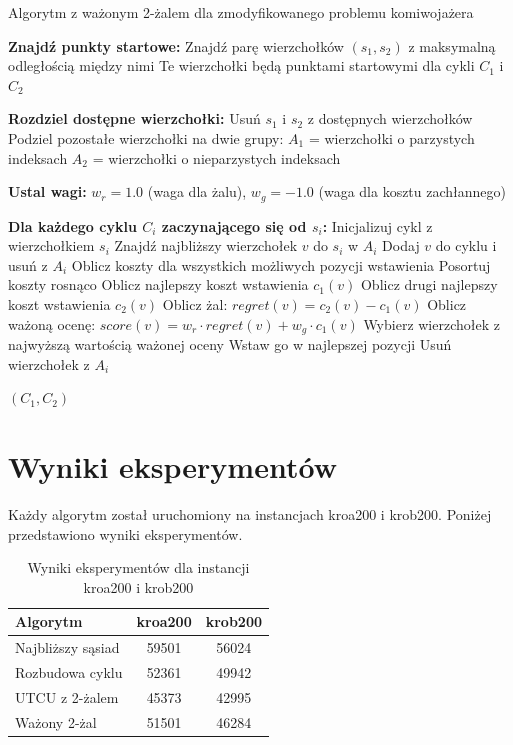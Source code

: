 \documentclass[12pt,a4paper]{article}
\begin{document}
\begin{algorithm}
\caption{Algorytm z ważonym 2-żalem dla zmodyfikowanego problemu komiwojażera}
\begin{algorithmic}[1]
\State \textbf{Znajdź punkty startowe:}
\State Znajdź parę wierzchołków $(s_1, s_2)$ z maksymalną odległością między nimi
\State Te wierzchołki będą punktami startowymi dla cykli $C_1$ i $C_2$

\State \textbf{Rozdziel dostępne wierzchołki:}
\State Usuń $s_1$ i $s_2$ z dostępnych wierzchołków
\State Podziel pozostałe wierzchołki na dwie grupy:
\State $A_1$ = wierzchołki o parzystych indeksach
\State $A_2$ = wierzchołki o nieparzystych indeksach

\State \textbf{Ustal wagi:} $w_r = 1.0$ (waga dla żalu), $w_g = -1.0$ (waga dla kosztu zachłannego)

\State \textbf{Dla każdego cyklu $C_i$ zaczynającego się od $s_i$:}
\State Inicjalizuj cykl z wierzchołkiem $s_i$
\State Znajdź najbliższy wierzchołek $v$ do $s_i$ w $A_i$
\State Dodaj $v$ do cyklu i usuń z $A_i$
        \State Oblicz koszty dla wszystkich możliwych pozycji wstawienia
        \State Posortuj koszty rosnąco
        \State Oblicz najlepszy koszt wstawienia $c_1(v)$
        \State Oblicz drugi najlepszy koszt wstawienia $c_2(v)$
        \State Oblicz żal: $regret(v) = c_2(v) - c_1(v)$
        \State Oblicz ważoną ocenę: $score(v) = w_r \cdot regret(v) + w_g \cdot c_1(v)$
    \EndFor
    \State Wybierz wierzchołek z najwyższą wartością ważonej oceny
    \State Wstaw go w najlepszej pozycji
    \State Usuń wierzchołek z $A_i$
\EndWhile

\State \Return $(C_1, C_2)$
\end{algorithmic}
\end{algorithm}

\section{Wyniki eksperymentów}
Każdy algorytm został uruchomiony na instancjach kroa200 i krob200. Poniżej przedstawiono wyniki eksperymentów.

\begin{table}[H]
\centering
\caption{Wyniki eksperymentów dla instancji kroa200 i krob200}
\begin{tabular}{lcc}
\toprule
\textbf{Algorytm} & \textbf{kroa200} & \textbf{krob200} \\
\midrule
Najbliższy sąsiad & 59501 & 56024 \\
Rozbudowa cyklu & 52361 & 49942 \\
UTCU z 2-żalem & 45373 & 42995 \\
Ważony 2-żal & 51501 & 46284 \\
\bottomrule
\end{tabular}
\end{table}
\end{document}
